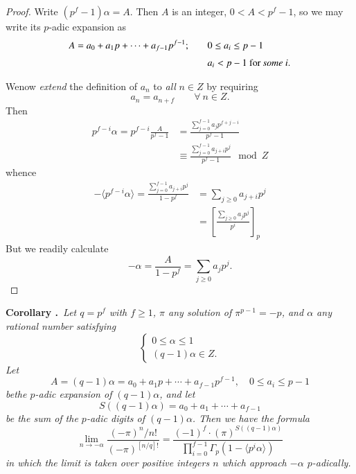 \begin{proof}
Write $(p^{f}-1)\alpha=A$. Then $A$ is an integer, $0<A<p^{f}-1$, so we may write its $p$-adic expansion as
\begin{align*}
A=a_{0}+a_{1}p+\cdots+a_{f-1}p^{f-1};\qquad & 0\leq a_{i}\leq p-1\\[3pt]
                                        & a_{i}<p-1\text{~ for {\em some~}} i.
\end{align*}

We\pageoriginale now {\em extend} the definition of $a_{n}$ to {\em all} $n\in Z$ by requiring
$$
a_{n}=a_{n+f}\qquad \forall \ n\in Z.
$$
Then
\begin{align*}
p^{f-i}\alpha=p^{f-i}\frac{A}{p^{f}-1} &= \frac{\sum\limits^{f-1}_{j=0}a_{j}p^{f+j-i}}{p^{f}-1}\\[4pt]
&\equiv \frac{\sum\limits^{f-1}_{j=0}a_{j+i}p^{j}}{p^{f}-1}\mod Z
\end{align*}
whence
\begin{align*}
-\langle p^{f-i}\alpha\rangle = \frac{\sum\limits^{f-1}_{j=0}a_{j+i}p^{j}}{1-p^{f}} &= \sum\limits_{j\geq 0}a_{j+i}p^{j}\\[4pt]
&=\left[\frac{\sum\limits_{j\geq 0}a_{j}p^{j}}{p^{i}}\right]_{p}
\end{align*}
But we readily calculate
$$
-\alpha = \frac{A}{1-p^{f}}=\sum\limits_{j\geq 0}a_{j}p^{j}.
$$
\end{proof}

\noindent
{\bf Corollary .\label{art6-coro7.9.9}}~{\em Let $q=p^{f}$ with $f\geq 1$, $\pi$ any solution of $\pi^{p-1}=-p$, and $\alpha$ any rational number satisfying}
$$
\begin{cases}
0\leq \alpha \leq 1\\[3pt]
(q-1)\alpha \in Z.
\end{cases}
$$
{\em Let}
$$
A=(q-1)\alpha =a_{0}+a_{1}p+\cdots+a_{f-1}p^{f-1},\quad 0\leq a_{i}\leq p-1
$$
{\em be\pageoriginale the $p$-adic expansion of $(q-1)\alpha$, and let}
$$
S((q-1)\alpha)=a_{0}+a_{1}+\cdots+a_{f-1}
$$
{\em be the sum of the $p$-adic digits of $(q-1)\alpha$. Then we have the formula}
\begin{equation*}
\lim\limits_{n\to -\alpha}\frac{(-\pi)^{n}/n!}{(-\pi)^{[n/q]!}}=\frac{(-1)^{f}\cdot (\pi)^{S((q-1)\alpha)}}{\prod\limits^{f-1}_{i=0}\Gamma_{p}(1-\langle p^{i}\alpha\rangle )}\tag{7.9.10}\label{art6-eq7.9.10}
\end{equation*}
{\em in which the limit is taken over positive integers $n$ which approach $-\alpha$ $p$-adically.}

